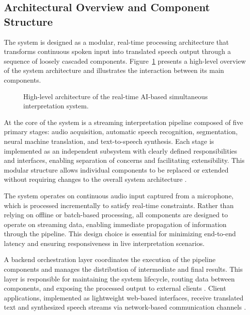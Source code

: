 \subsection{Architectural Overview and Component Structure}

The system is designed as a modular, real-time processing architecture that transforms continuous spoken input into translated speech output through a sequence of loosely cascaded components. Figure~\ref{fig:system_architecture} presents a high-level overview of the system architecture and illustrates the interaction between its main components.

\begin{figure}[!htbp]
  \centering
  
  \caption[Real-time AI-based interpretation system architecture]{High-level architecture of the real-time AI-based simultaneous interpretation system.}
  \label{fig:system_architecture}
\end{figure}


At the core of the system is a streaming interpretation pipeline composed of five primary stages: audio acquisition, automatic speech recognition, segmentation, neural machine translation, and text-to-speech synthesis. Each stage is implemented as an independent subsystem with clearly defined responsibilities and interfaces, enabling separation of concerns and facilitating extensibility. This modular structure allows individual components to be replaced or extended without requiring changes to the overall system architecture \cite{Aminzadeh2009Advocate}.

The system operates on continuous audio input captured from a microphone, which is processed incrementally to satisfy real-time constraints. Rather than relying on offline or batch-based processing, all components are designed to operate on streaming data, enabling immediate propagation of information through the pipeline. This design choice is essential for minimizing end-to-end latency and ensuring responsiveness in live interpretation scenarios.

A backend orchestration layer coordinates the execution of the pipeline components and manages the distribution of intermediate and final results. This layer is responsible for maintaining the system lifecycle, routing data between components, and exposing the processed output to external clients \cite{he2019streamingarxiv}. Client applications, implemented as lightweight web-based interfaces, receive translated text and synthesized speech streams via network-based communication channels \cite{sathya2025realtime}.

